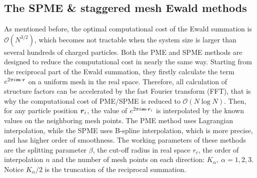 \documentclass[journal=jacsat,manuscript=article]{achemso}
\newcommand{\redc}[1]{{\color{black} #1}}
\renewcommand{\v}[1]{\textbf{\textit{#1}}}
\begin{document}
\subsection{The SPME \&
staggered mesh Ewald methods}


As mentioned before, the 
optimal computational cost of the Ewald summation
is $\mathcal O(N^{3/2})$,
which becomes not \redc{tractable} when the system
size is larger than several hundreds of charged particles.
Both the PME \redc{and} SPME methods
are designed to reduce
the computational cost  in nearly the same
way.
Starting from the reciprocal part of the Ewald summation,
they firstly  calculate the term $e^{2\pi i\v m\cdot\v r}$ on a uniform
mesh in the real space.  Therefore, all calculation of structure factors
can be
accelerated by the fast Fourier transform (FFT), that is why the
computational cost of PME/SPME is reduced to $\mathcal O(N\log N)$. Then,
for any particle position $\v r_i$, the value of $e^{2\pi i\v m\cdot\v
  r_i}$ is interpolated by the known values on the neighboring mesh
points.  The PME method uses Lagrangian interpolation, while the SPME
uses B-spline interpolation,  which is more precise, and has higher order
of smoothness.
The working parameters of these methods are
the splitting parameter $\beta$,
the cut-off radius in real space $r_c$,
the order of interpolation $n$ and
the number of mesh points on each direction:  $K_\alpha,\ \alpha = 1,2,3$.
Notice $K_\alpha/2$ is the truncation
of the reciprocal summation.
\end{document}
